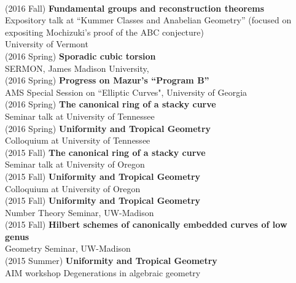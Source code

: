 \documentclass[margin,line]{res}
\begin{document}
\begin{resume}
\vspace{.05cm}\\
(2016 Fall) \textbf{Fundamental groups and reconstruction theorems}\\ Expository talk at ``Kummer Classes and Anabelian Geometry'' (focused on expositing Mochizuki's proof of the ABC conjecture)\\ University of Vermont  
\vspace{.05cm}\\
(2016 Spring) \textbf{Sporadic cubic torsion}\\  
SERMON, James Madison University, 
\vspace{.05cm}\\
(2016 Spring) \textbf{Progress on Mazur's ``Program B''}\\  
AMS Special Session on  ``Elliptic Curves", University of Georgia
\vspace{.05cm}\\
(2016 Spring) \textbf{The canonical ring of a stacky curve}\\  
Seminar talk at University of Tennessee
\vspace{.05cm}\\
(2016 Spring) \textbf{Uniformity and Tropical Geometry}\\
Colloquium at University of Tennessee
\vspace{.05cm}\\
(2015 Fall) \textbf{The canonical ring of a stacky curve}\\  
Seminar talk at University of Oregon
\vspace{.05cm}\\
(2015 Fall) \textbf{Uniformity and Tropical Geometry}\\
Colloquium at University of Oregon
\vspace{.05cm}\\
(2015 Fall) \textbf{Uniformity and Tropical Geometry}\\
Number Theory Seminar, UW-Madison
\vspace{.05cm}\\
(2015 Fall) \textbf{Hilbert schemes of canonically embedded curves of low genus}\\
Geometry Seminar, UW-Madison
\vspace{.05cm}\\
(2015 Summer) \textbf{Uniformity and Tropical Geometry}\\
AIM workshop Degenerations in algebraic geometry
\vspace{.05cm}\\

\end{resume}
\end{document}
